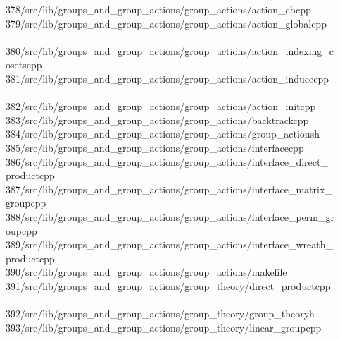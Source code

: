 \begin{tabbing}
378\>/src/lib/groups\_and\_group\_actions/group\_actions/action\_cbcpp\\[0pt]
379\>/src/lib/groups\_and\_group\_actions/group\_actions/action\_globalcpp\\[0pt]
\>\\[0pt]
380\>/src/lib/groups\_and\_group\_actions/group\_actions/action\_indexing\_c\\[0pt]
\>osetscpp\\[0pt]
381\>/src/lib/groups\_and\_group\_actions/group\_actions/action\_inducecpp\\[0pt]
\>\\[0pt]
382\>/src/lib/groups\_and\_group\_actions/group\_actions/action\_initcpp\\[0pt]
383\>/src/lib/groups\_and\_group\_actions/group\_actions/backtrackcpp\\[0pt]
384\>/src/lib/groups\_and\_group\_actions/group\_actions/group\_actionsh\\[0pt]
385\>/src/lib/groups\_and\_group\_actions/group\_actions/interfacecpp\\[0pt]
386\>/src/lib/groups\_and\_group\_actions/group\_actions/interface\_direct\_\\[0pt]
\>productcpp\\[0pt]
387\>/src/lib/groups\_and\_group\_actions/group\_actions/interface\_matrix\_\\[0pt]
\>groupcpp\\[0pt]
388\>/src/lib/groups\_and\_group\_actions/group\_actions/interface\_perm\_gr\\[0pt]
\>oupcpp\\[0pt]
389\>/src/lib/groups\_and\_group\_actions/group\_actions/interface\_wreath\_\\[0pt]
\>productcpp\\[0pt]
390\>/src/lib/groups\_and\_group\_actions/group\_actions/makefile\\[0pt]
391\>/src/lib/groups\_and\_group\_actions/group\_theory/direct\_productcpp\\[0pt]
\>\\[0pt]
392\>/src/lib/groups\_and\_group\_actions/group\_theory/group\_theoryh\\[0pt]
393\>/src/lib/groups\_and\_group\_actions/group\_theory/linear\_groupcpp\\[0pt]

\end{tabbing}
